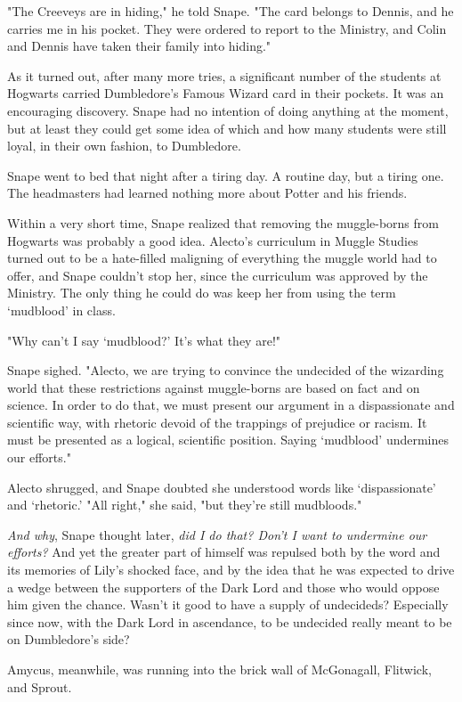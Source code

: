 \documentclass[a4paper,11pt]{article}
\begin{document}
"The Creeveys are in hiding," he told Snape. "The card belongs to Dennis, and he carries me in his pocket. They were ordered to report to the Ministry, and Colin and Dennis have taken their family into hiding."

As it turned out, after many more tries, a significant number of the students at Hogwarts carried Dumbledore's Famous Wizard card in their pockets. It was an encouraging discovery. Snape had no intention of doing anything at the moment, but at least they could get some idea of which and how many students were still loyal, in their own fashion, to Dumbledore.

Snape went to bed that night after a tiring day. A routine day, but a tiring one. The headmasters had learned nothing more about Potter and his friends.

Within a very short time, Snape realized that removing the muggle-borns from Hogwarts was probably a good idea. Alecto's curriculum in Muggle Studies turned out to be a hate-filled maligning of everything the muggle world had to offer, and Snape couldn't stop her, since the curriculum was approved by the Ministry. The only thing he could do was keep her from using the term `mudblood' in class.

"Why can't I say `mudblood?' It's what they are!"

Snape sighed. "Alecto, we are trying to convince the undecided of the wizarding world that these restrictions against muggle-borns are based on fact and on science. In order to do that, we must present our argument in a dispassionate and scientific way, with rhetoric devoid of the trappings of prejudice or racism. It must be presented as a logical, scientific position. Saying `mudblood' undermines our efforts."

Alecto shrugged, and Snape doubted she understood words like `dispassionate' and `rhetoric.' "All right," she said, "but they're still mudbloods."

\emph{And why}, Snape thought later, \emph{did I do that? Don't I want to undermine our efforts?} And yet the greater part of himself was repulsed both by the word and its memories of Lily's shocked face, and by the idea that he was expected to drive a wedge between the supporters of the Dark Lord and those who would oppose him given the chance. Wasn't it good to have a supply of undecideds? Especially since now, with the Dark Lord in ascendance, to be undecided really meant to be on Dumbledore's side?

Amycus, meanwhile, was running into the brick wall of McGonagall, Flitwick, and Sprout.
\end{document}
